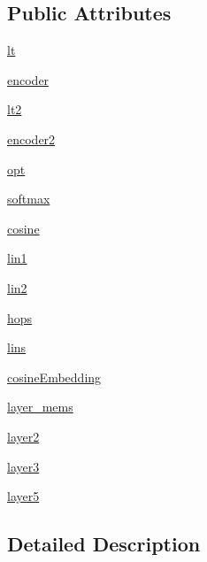\subsection*{Public Attributes}
\begin{DoxyCompactItemize}
\item 
\hyperlink{classmodules_1_1Kvmemnn_aa4c97cdfa243072fcc5f466187911bbf}{lt}
\item 
\hyperlink{classmodules_1_1Kvmemnn_a766a4d6a5bf185e11c69a4e160ca6e78}{encoder}
\item 
\hyperlink{classmodules_1_1Kvmemnn_a61ec6a6dbebbdfd42ca0d2515b9b5009}{lt2}
\item 
\hyperlink{classmodules_1_1Kvmemnn_a7a2287b58c302c3ede21015331b79762}{encoder2}
\item 
\hyperlink{classmodules_1_1Kvmemnn_a2877519275db7685b91aa9eb52fc2215}{opt}
\item 
\hyperlink{classmodules_1_1Kvmemnn_a0e6f77ae3ba405fa58d6515f48324395}{softmax}
\item 
\hyperlink{classmodules_1_1Kvmemnn_a0506fd88e99167de46b9282f24fc0d80}{cosine}
\item 
\hyperlink{classmodules_1_1Kvmemnn_a10f27d4682393615a3a077a908eafb1a}{lin1}
\item 
\hyperlink{classmodules_1_1Kvmemnn_afc462bec9809678b6003e5a371845a76}{lin2}
\item 
\hyperlink{classmodules_1_1Kvmemnn_ab5ea36950bcf5806c29c01aa05d4acea}{hops}
\item 
\hyperlink{classmodules_1_1Kvmemnn_afec135c6e3c8e3d0c0fa0824b2401f10}{lins}
\item 
\hyperlink{classmodules_1_1Kvmemnn_a412408a69168046b63dc50ea791f9eb7}{cosine\+Embedding}
\item 
\hyperlink{classmodules_1_1Kvmemnn_a9956f20f0ba7f6e7b5d2080c74e52f0f}{layer\+\_\+mems}
\item 
\hyperlink{classmodules_1_1Kvmemnn_a11f58c577dda0e3e00c6a47304ab0843}{layer2}
\item 
\hyperlink{classmodules_1_1Kvmemnn_aabe656056e2178c2660a78d783504002}{layer3}
\item 
\hyperlink{classmodules_1_1Kvmemnn_a63b866fd4178a849ba879885a844c262}{layer5}
\end{DoxyCompactItemize}


\subsection{Detailed Description}


